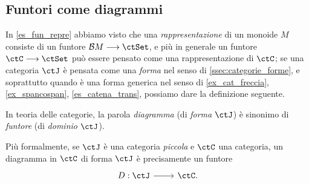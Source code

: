 \subsection{Funtori come diagrammi}
In \ref{es_fun_repre} abbiamo visto che una \emph{rappresentazione} di un monoide \(M\) consiste di un funtore \(\susp M \fun\ctSet\), e più in generale un funtore \(\ctC\fun\ctSet\) può essere pensato come una rappresentazione di \(\ctC\); se una categoria \(\ctJ\) è pensata come una \emph{forma} nel senso di \ref{ssec:categorie_forme}, e soprattutto quando è una forma generica nel senso di \ref{ex_cat_freccia}, \ref{ex_spancospan}, \ref{es_catena_trans}, possiamo dare la definizione seguente.
\begin{definition}\label{def_diagramma_comm}
 In teoria delle categorie, la parola \emph{diagramma} (di \emph{forma} \(\ctJ\)) è sinonimo di \emph{funtore} (di \emph{dominio} \(\ctJ\)).

 Più formalmente, se \(\ctJ\) è una categoria \emph{piccola} e \(\ctC\) una categoria, un diagramma in \(\ctC\) di forma \(\ctJ\) è precisamente un funtore
 \[\begin{tikzcd}
   D : \ctJ \ar[r] & \ctC.
  \end{tikzcd}
 \]
\end{definition}
